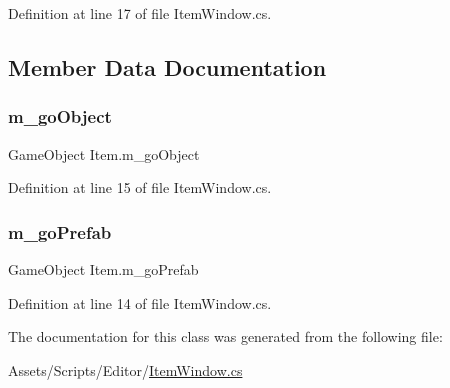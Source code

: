 Definition at line 17 of file Item\+Window.\+cs.



\subsection{Member Data Documentation}
\mbox{\label{class_item_a68e7854fff8405266afca47a85058c35}} 
\subsubsection{\texorpdfstring{m\+\_\+go\+Object}{m\_goObject}}
{\footnotesize\ttfamily Game\+Object Item.\+m\+\_\+go\+Object}



Definition at line 15 of file Item\+Window.\+cs.

\mbox{\label{class_item_ae7c88eadc3a991079f15289361967d4a}} 
\subsubsection{\texorpdfstring{m\+\_\+go\+Prefab}{m\_goPrefab}}
{\footnotesize\ttfamily Game\+Object Item.\+m\+\_\+go\+Prefab}



Definition at line 14 of file Item\+Window.\+cs.



The documentation for this class was generated from the following file\+:\begin{DoxyCompactItemize}
\item 
Assets/\+Scripts/\+Editor/\mbox{\hyperlink{_item_window_8cs}{Item\+Window.\+cs}}\end{DoxyCompactItemize}
